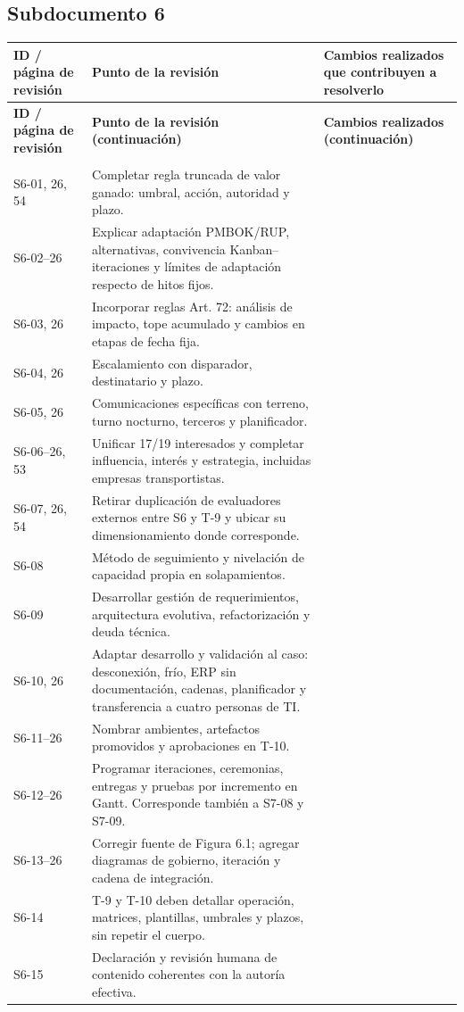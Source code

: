 \documentclass[11pt,letterpaper]{article}
\makeatletter
\newcommand{\inicioTabla}{%
  \small
  \begin{longtable}{@{}>{\raggedright\arraybackslash}p{.13\linewidth}>{\raggedright\arraybackslash}p{.43\linewidth}>{\raggedright\arraybackslash}p{.39\linewidth}@{}}
  \toprule
  \textbf{ID / página de revisión} & \textbf{Punto de la revisión} & \textbf{Cambios realizados que contribuyen a resolverlo} \\
  \midrule\endfirsthead
  \toprule
  \textbf{ID / página de revisión} & \textbf{Punto de la revisión (continuación)} & \textbf{Cambios realizados (continuación)} \\
  \midrule\endhead
  \midrule\multicolumn{3}{r}{\footnotesize Continúa en la página siguiente.}\\\endfoot
  \bottomrule\endlastfoot
}
\newcommand{\finTabla}{\end{longtable}\normalsize}
\makeatother
\begin{document}
\subsection{Subdocumento 6}
\inicioTabla
S6-01\newline 23, 26, 54 & Completar regla truncada de valor ganado: umbral, acción, autoridad y plazo. & \\
S6-02\newline 23--26 & Explicar adaptación PMBOK/RUP, alternativas, convivencia Kanban--iteraciones y límites de adaptación respecto de hitos fijos. & \\
S6-03\newline 23, 26 & Incorporar reglas Art. 72: análisis de impacto, tope acumulado y cambios en etapas de fecha fija. & \\
S6-04\newline 23, 26 & Escalamiento con disparador, destinatario y plazo. & \\
S6-05\newline 23, 26 & Comunicaciones específicas con terreno, turno nocturno, terceros y planificador. & \\
S6-06\newline 23--26, 53 & Unificar 17/19 interesados y completar influencia, interés y estrategia, incluidas empresas transportistas. & \\
S6-07\newline 24, 26, 54 & Retirar duplicación de evaluadores externos entre S6 y T-9 y ubicar su dimensionamiento donde corresponde. & \\
S6-08\newline 24 & Método de seguimiento y nivelación de capacidad propia en solapamientos. & \\
S6-09\newline 24 & Desarrollar gestión de requerimientos, arquitectura evolutiva, refactorización y deuda técnica. & \\
S6-10\newline 24, 26 & Adaptar desarrollo y validación al caso: desconexión, frío, ERP sin documentación, cadenas, planificador y transferencia a cuatro personas de TI. & \\
S6-11\newline 25--26 & Nombrar ambientes, artefactos promovidos y aprobaciones en T-10. & \\
S6-12\newline 25--26 & Programar iteraciones, ceremonias, entregas y pruebas por incremento en Gantt. Corresponde también a S7-08 y S7-09. & \\
S6-13\newline 25--26 & Corregir fuente de Figura 6.1; agregar diagramas de gobierno, iteración y cadena de integración. & \\
S6-14\newline 26 & T-9 y T-10 deben detallar operación, matrices, plantillas, umbrales y plazos, sin repetir el cuerpo. & \\
S6-15\newline 26 & Declaración y revisión humana de contenido coherentes con la autoría efectiva. & \\
\finTabla
\end{document}
